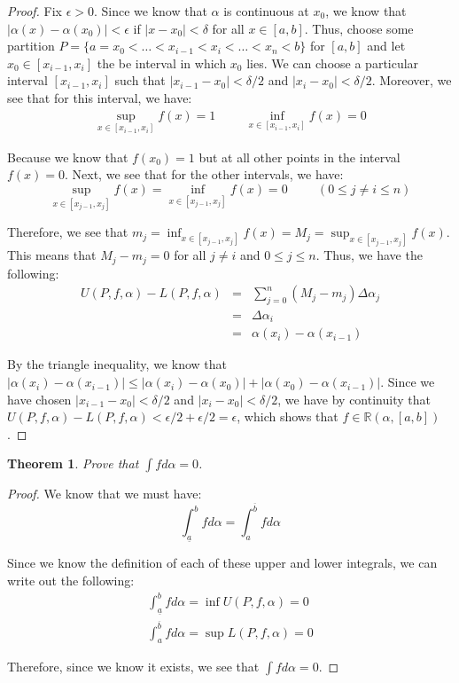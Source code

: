\documentclass[psamsfonts]{amsart}
\newtheorem{thm}{Theorem}[section]
\theoremstyle{definition}
\theoremstyle{remark}
\numberwithin{equation}{section}
\begin{document}
\begin{proof}
Fix $\epsilon > 0$. Since we know that $\alpha$ is continuous at $x_0$, we know that $|\alpha(x) - \alpha(x_0)| < \epsilon$ if $|x - x_0| < \delta$ for all $x \in [a,b]$. Thus, choose some partition $P = \{a = x_0 < \ldots < x_{i-1} < x_i < \ldots < x_n < b \}$ for $[a,b]$ and let $x_0 \in [x_{i-1},x_i]$ the be interval in which $x_0$ lies. We can choose a particular interval $[x_{i-1},x_i]$ such that $| x_{i-1} - x_0 | < \delta/2$ and $|x_i - x_0 | < \delta/2$. Moreover, we see that for this interval, we have:
\begin{eqnarray}
\sup_{x \in [x_{i-1},x_i]} f(x) = 1 \hspace{1cm} \inf_{x \in [x_{i-1},x_i]} f(x) = 0
\end{eqnarray}

Because we know that $f(x_0) = 1$ but at all other points in the interval $f(x) = 0$. Next, we see that for the other intervals, we have:
\begin{equation}
\sup_{x \in [x_{j-1},x_j]} f(x) = \inf_{x \in [x_{j-1},x_j]} f(x) = 0 \hspace{1cm} ( 0 \leq j \neq i\leq n )
\end{equation}

Therefore, we see that $m_j = \inf_{x \in [x_{j-1},x_j]} f(x) = M_j = \sup_{x \in [x_{j-1},x_j]} f(x)$. This means that $M_j - m_j = 0$ for all $j \neq i$ and $0 \leq j \leq n$. Thus, we have the following:
\begin{eqnarray}
U(P,f,\alpha) - L(P,f,\alpha) &=& \sum_{j = 0}^n (M_j - m_j) \Delta \alpha_j \\
&=& \Delta \alpha_i \\
&=& \alpha(x_i) - \alpha(x_{i-1}) 
\end{eqnarray}

By the triangle inequality, we know that $|\alpha(x_i) - \alpha(x_{i-1})|\leq |\alpha(x_i) - \alpha(x_0)| + |\alpha(x_0) - \alpha(x_{i-1}) |$. Since we have chosen $|x_{i-1} - x_0| < \delta/2$ and $|x_i - x_0| < \delta/2$, we have by continuity that $U(P,f,\alpha) - L(P,f,\alpha) < \epsilon/2 + \epsilon/2 = \epsilon$, which shows that $f \in \mathbb{R}(\alpha, [a,b])$. 
\end{proof}

\begin{thm}
Prove that $\int f d \alpha = 0$. 
\end{thm}

\begin{proof}
We know that we must have:
\begin{equation}
\int_{\underline{a}}^b f d \alpha = \int_{a}^{\overline{b}} f d \alpha
\end{equation}

Since we know the definition of each of these upper and lower integrals, we can write out the following:
\begin{eqnarray}
\int_{\underline{a}}^b f d \alpha = \inf U(P,f,\alpha) = 0 \\
\int_{a}^{\overline{b}} f d \alpha = \sup L(P,f,\alpha) = 0
\end{eqnarray}

Therefore, since we know it exists, we see that $\int f d\alpha = 0$. 
\end{proof}
\end{document}
